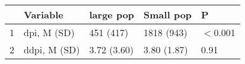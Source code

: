 \begin{table}[ht]
\centering
\begin{tabular}{rllll}
  \hline
 & Variable & large pop & Small pop & P \\ 
  \hline
1 & dpi, M (SD) & 451 (417) & 1818 (943) & $<$0.001 \\ 
  2 & ddpi, M (SD) & 3.72 (3.60) & 3.80 (1.87) & 0.91 \\ 
   \hline
\end{tabular}
\end{table}
